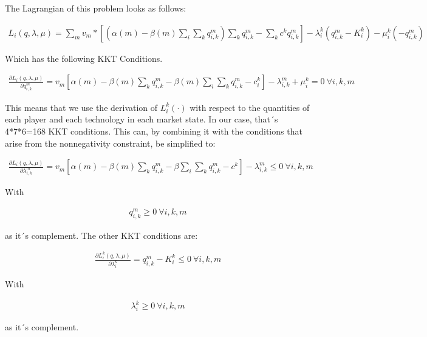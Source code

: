 \documentclass[a4paper,12pt]{article}
\theoremstyle{remark}
\begin{document}
The Lagrangian of this problem looks as follows:

\begin{gather}
	L_i(q,\lambda,\mu)= \sum_m v_m * \left[ (\alpha(m)-\beta(m)\sum_i \sum_k q_{i,k}^m ) \sum_k q_{i,k}^m - \sum_k c^k q_{i,k}^m \right] - \lambda_i^k (q_{i,k}^m - K_i^k)-\mu_i^k(-q_{i,k}^m)
\end{gather}

Which has the following KKT Conditions. 

\begin{gather}
\frac{\partial L_i(q,\lambda,\mu)}{\partial q_{i,k}^m}	= v_m\left[ \alpha(m) - \beta(m) \sum_k q_{i,k}^m - \beta(m)\sum_i \sum_k q_{i,k}^m - c_i^k \right] - \lambda_{i,k}^m + \mu_i^k = 0 \ \forall i,k,m
\end{gather}

This means that we use the derivation of $L_i^k(\cdot)$ with respect to the quantities of each player and each technology in each market state. In our case, that´s 4*7*6=168 KKT conditions. This can, by combining it with the conditions that arise from the nonnegativity constraint, be simplified to:

\begin{gather}
\frac{\partial L_i(q,\lambda,\mu)}{\partial \lambda_{i,k}^m}	= v_m \left[ \alpha(m) - \beta(m) \sum_k q_{i,k}^m - \beta\sum_i \sum_k q_{i,k}^m - c^k \right] - \lambda_{i,k}^m \leq 0 \ \forall i,k,m
\end{gather}

With

\begin{gather}
q_{i,k}^m \geq 0 \ \forall i,k,m
\end{gather}

as it´s complement.
The other KKT conditions are:

\begin{gather}
\frac{\partial L_i^k(q,\lambda,\mu)}{\partial \lambda_i^k}	= q_{i,k}^m-K_i^k \leq 0 \ \forall i,k,m
\end{gather}

With 

\begin{gather}
\lambda_i^k \geq 0 \  \forall i,k,m
\end{gather}

as it´s complement.
\end{document}
